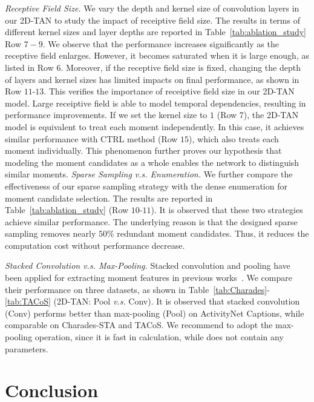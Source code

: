 \documentclass[letterpaper]{article} %
\begin{document}
\textit{Receptive Field Size. } We vary the depth and kernel size of convolution layers in our 2D-TAN to study the impact of receiptive field size.
The results in terms of different kernel sizes and layer depths are reported in Table~\ref{tab:ablation_study} Row $7-9$.
We observe that the performance increases significantly as the receptive field enlarges.
However, it becomes saturated when it is large enough, as listed in Row $6$.
Moreover, if the receptive field size is fixed, changing the depth of layers and kernel sizes has limited impacts on final performance, as shown in Row $11$-$13$.
This verifies the importance of receiptive field size in our 2D-TAN model. Large receiptive field is able to model temporal dependencies, resulting in performance improvements.
If we set the kernel size to $1$ (Row $7$), the 2D-TAN model is equivalent to treat each moment independently. In this case, it achieves similar performance with CTRL method (Row $15$), which also treats each moment individually.
This phenomenon further proves our hypothesis that modeling the moment candidates as a whole enables the network to distinguish similar moments.  \textit{Sparse Sampling \emph{v.s.} Enumeration.}
We further compare the effectiveness of our sparse sampling strategy with the dense enumeration for moment candidate selection. The results are reported in Table~\ref{tab:ablation_study} (Row $10$-$11$). It is observed that these two strategies achieve similar performance. The underlying reason is that the designed sparse sampling removes nearly $50\%$ redundant moment candidates. Thus, it reduces the computation cost without performance decrease.

\textit{Stacked Convolution \emph{v.s.} Max-Pooling.}
Stacked convolution and pooling have been applied for extracting moment features in previous works~\cite{hendricks17iccv,zhang2019man}.
We compare their performance on three datasets, as  shown in Table~\ref{tab:Charades}-\ref{tab:TACoS} (2D-TAN: Pool \emph{v.s.} Conv).
It is observed that stacked convolution (Conv) performs better than max-pooling (Pool) on ActivityNet Captions, while comparable on Charades-STA and TACoS. We recommend to adopt the max-pooling operation, since it is fast in calculation, while does not contain any parameters.

\vspace{-0.81mm}
\vspace{-1.44mm}
\section{Conclusion}
\end{document}
